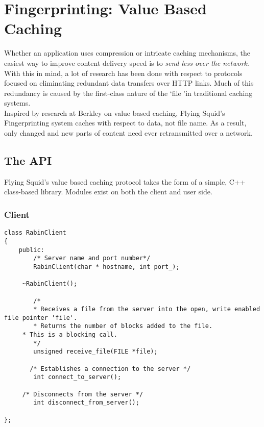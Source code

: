 \section{Fingerprinting: Value Based Caching}

 Whether an application uses compression or intricate caching mechanisms, the easiest way to improve content delivery speed is to \textit{send less over the network}. With this in mind, a lot of research has been done with respect to protocols focused on eliminating redundant data transfers over HTTP links. Much of this redundancy is caused by the first-class nature of the \lq file \rq in traditional caching systems.\\

\noindent
Inspired by research at Berkley on value based caching\cite{Rhea09}, Flying Squid's Fingerprinting system caches with respect to data, not file name. As a result, only changed and new parts of content need ever retransmitted over a network. 


\subsection{The API}

Flying Squid's value based caching protocol takes the form of a simple, C++ class-based library. Modules exist on both the client and user side.

\subsubsection{Client}

\begin{lstlisting}
class RabinClient
{
    public:
        /* Server name and port number*/
        RabinClient(char * hostname, int port_);
       
	 ~RabinClient();

        /*
        * Receives a file from the server into the open, write enabled file pointer 'file'.
        * Returns the number of blocks added to the file.
	 * This is a blocking call.
        */
        unsigned receive_file(FILE *file); 

       /* Establishes a connection to the server */
        int connect_to_server();

	 /* Disconnects from the server */
        int disconnect_from_server();

};

\end{lstlisting}

